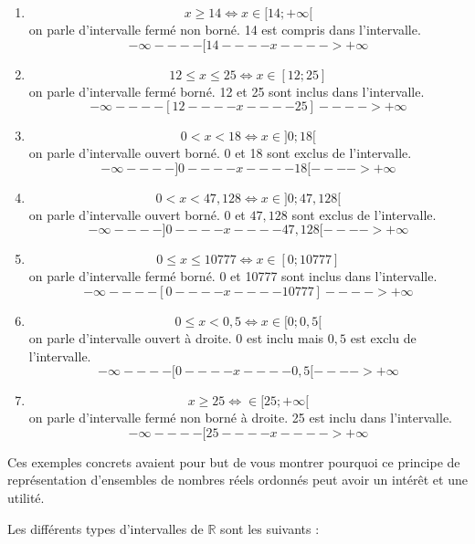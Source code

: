 \documentclass[a4paper,11pt]{book}
\begin{document}
\begin{enumerate}
\item \[x \geq 14 \iff x\in [ 14 ; +\infty [ \] on parle
d'intervalle fermé non borné. 14
est compris dans l'intervalle.
\[-\infty ---- [14 ---- x ----> +\infty\]

\item \[12 \leq x \leq 25\iff x\in [12; 25]\] on parle
d'intervalle fermé borné. 12 et 25
sont inclus dans l'intervalle.
\[-\infty ---- [12 ---- x ----25] ----> +\infty\]

\item \[0 < x < 18\iff x\in ]0; 18[\] on parle
d'intervalle ouvert borné. 0 et 18
sont exclus de l'intervalle.
\[-\infty ----] 0 ---- x ---- 18 [----> +\infty\]

\item \[0 < x < 47,128\iff x\in ]0; 47,128[\] on parle
d'intervalle ouvert borné. \(0\) et
\(47,128\) sont exclus de l'intervalle.
\[-\infty ----] 0 ---- x ---- 47,128 [ ----> +\infty\]

\item \[0\leq x \leq 10 777\iff x\in [0; 10777]\] on parle
d'intervalle fermé borné. 0 et 10777
sont inclus dans l'intervalle.
\[-\infty ---- [0 ---- x ----10777] ----> +\infty\]

\item \[0 \leq x < 0,5\iff x\in [0; 0,5[\] on parle d'intervalle ouvert à
droite. \(0\) est inclu mais \(0,5\) est exclu de l'intervalle.
\[-\infty ---- [0 ---- x ---- 0,5 [----> +\infty\]

\item \[x \geq 25\iff \in [25; +\infty[\] on parle d'intervalle fermé non
borné à droite. 25 est inclu dans l'intervalle.
\[-\infty ---- [25 ---- x ----> +\infty\]
\end{enumerate}


Ces exemples concrets avaient pour but de vous montrer pourquoi ce
principe de représentation d'ensembles de nombres
réels ordonnés peut avoir un intérêt et une
utilité.

Les différents types d'intervalles de
\(\mathbb{R}\) sont les suivants :
\end{document}

